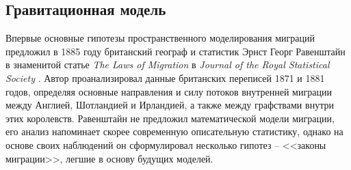 \documentclass[a4paper,12pt]{article}
\begin{document}
\subsection{Гравитационная модель}\label{sec:gravity}

Впервые основные гипотезы пространственного моделирования миграций предложил в 1885 году британский географ и статистик Эрнст Георг Равенштайн в знаменитой статье \emph{The Laws of Migration} в \emph{Journal of the Royal Statistical Society} \citep{ravenstein_laws_1885}. Автор проанализировал данные британских переписей 1871 и 1881 годов, определяя основные направления и силу потоков внутренней миграции между Англией, Шотландией и Ирландией, а также между графствами внутри этих королевств. Равенштайн не предложил математической модели миграции, его анализ напоминает скорее современную описательную статистику, однако на основе своих наблюдений он сформулировал несколько гипотез -- <<законы миграции>>, легшие в основу будущих моделей.

\end{document}
